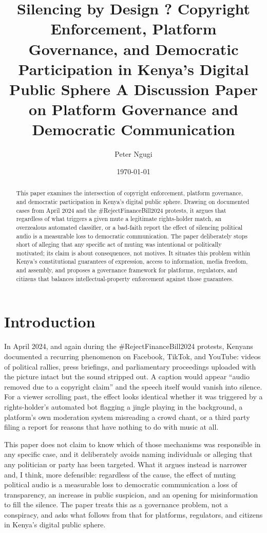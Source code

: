 \documentclass{article}
\title{Silencing by Design ? Copyright Enforcement, Platform Governance, and Democratic Participation in Kenya's Digital Public Sphere
A Discussion Paper on Platform Governance and Democratic Communication}
\author{Peter Ngugi}
\date{\today}
\begin{document}
\maketitle
\begin{abstract}
This paper examines the intersection of copyright enforcement, platform governance, and democratic participation in Kenya's digital public sphere. Drawing on documented cases from April 2024 and the \#RejectFinanceBill2024 protests, it argues that regardless of what triggers a given mute a legitimate rights-holder match, an overzealous automated classifier, or a bad-faith report the effect of silencing political audio is a measurable loss to democratic communication. The paper deliberately stops short of alleging that any specific act of muting was intentional or politically motivated; its claim is about consequences, not motives. It situates this problem within Kenya's constitutional guarantees of expression, access to information, media freedom, and assembly, and proposes a governance framework for platforms, regulators, and citizens that balances intellectual-property enforcement against those guarantees.
\end{abstract}

\section{Introduction}
\par In April 2024, and again during the \#RejectFinanceBill2024 protests, Kenyans documented a recurring phenomenon on Facebook, TikTok, and YouTube: videos of political rallies, press briefings, and parliamentary proceedings uploaded with the picture intact but the sound stripped out. A caption would appear “audio removed due to a copyright claim” and the speech itself would vanish into silence. For a viewer scrolling past, the effect looks identical whether it was triggered by a rights-holder’s automated bot flagging a jingle playing in the background, a platform’s own moderation system misreading a crowd chant, or a third party filing a report for reasons that have nothing to do with music at all.
\par
This paper does not claim to know which of those mechanisms was responsible in any specific case, and it deliberately avoids naming individuals or alleging that any politician or party has been targeted. What it argues instead is narrower and, I think, more defensible: regardless of the cause, the effect of muting political audio is a measurable loss to democratic communication a loss of transparency, an increase in public suspicion, and an opening for misinformation to fill the silence. The paper treats this as a governance problem, not a conspiracy, and asks what follows from that for platforms, regulators, and citizens in Kenya’s digital public sphere.
\end{document}

